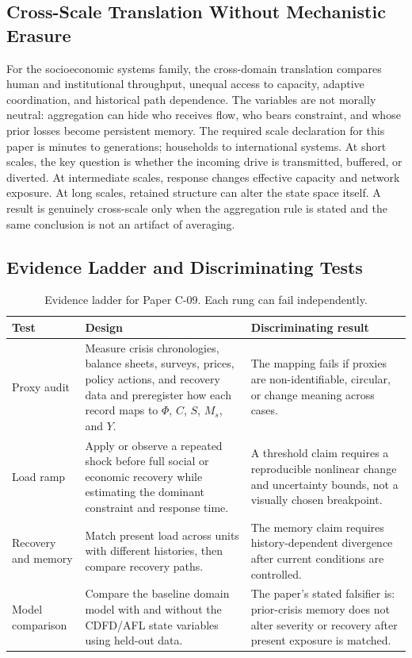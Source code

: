 \documentclass[11pt,a4paper]{article}
\begin{document}
\subsection{Cross-Scale Translation Without Mechanistic Erasure}

For the socioeconomic systems family, the cross-domain translation compares human and institutional throughput, unequal access to capacity, adaptive coordination, and historical path dependence. The variables are not morally neutral: aggregation can hide who receives flow, who bears constraint, and whose prior losses become persistent memory. \cite{BarabasiAlbert1999,WattsStrogatz1998,Holling1973,Shannon1948}
The required scale declaration for this paper is minutes to generations; households to international systems. At short
scales, the key question is whether the incoming drive is transmitted,
buffered, or diverted. At intermediate scales, response changes effective
capacity and network exposure. At long scales, retained structure can alter the
state space itself. A result is genuinely cross-scale only when the aggregation
rule is stated and the same conclusion is not an artifact of averaging.

\subsection{Evidence Ladder and Discriminating Tests}

\begin{table}[htbp]
\centering
\small
\caption{Evidence ladder for Paper C-09. Each rung can fail independently.}
\begin{tabularx}{\textwidth}{|p{}|X|X|}
\hline
\textbf{Test} & \textbf{Design} & \textbf{Discriminating result} \\
\hline
Proxy audit & Measure crisis chronologies, balance sheets, surveys, prices, policy actions, and recovery data and preregister how each record maps to $\Phi$, $C$, $S$, $M_s$, and $Y$. & The mapping fails if proxies are non-identifiable, circular, or change meaning across cases. \\
\hline
Load ramp & Apply or observe a repeated shock before full social or economic recovery while estimating the dominant constraint and response time. & A threshold claim requires a reproducible nonlinear change and uncertainty bounds, not a visually chosen breakpoint. \\
\hline
Recovery and memory & Match present load across units with different histories, then compare recovery paths. & The memory claim requires history-dependent divergence after current conditions are controlled. \\
\hline
Model comparison & Compare the baseline domain model with and without the CDFD/AFL state variables using held-out data. & The paper's stated falsifier is: prior-crisis memory does not alter severity or recovery after present exposure is matched. \\
\hline
\end{tabularx}
\end{table}
\end{document}
